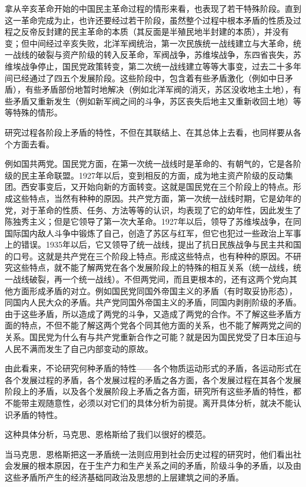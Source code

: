 拿从辛亥革命开始的中国民主革命过程的情形来看，也表现了若干特殊阶段。直到这一革命完成为止，也许还要经过若干阶段，虽然整个过程中根本矛盾的性质及过程之反帝反封建的民主革命的本质（其反面是半殖民地半封建的本质），并没有变；但中间经过辛亥失败，北洋军阀统治，第一次民族统一战线建立与大革命，统一战线的破裂与资产阶级的转入反革命，军阀战争，苏维埃战争，东四省丧失，苏维埃战争停止，国民党政策转变，第二次统一战线建立等等大事变，过去二十多年间已经通过了四五个发展阶段。这些阶段中，包含着有些矛盾激化（例如中日矛盾），有些矛盾部份地暂时地解决（例如北洋军阀的消灭，苏区没收地主土地），有些矛盾又重新发生（例如新军阀之间的斗争，苏区丧失后地主又重新收回土地）等等特殊的情形。

研究过程各阶段上矛盾的特性，不但在其联结上、在其总体上去看，也同样要从各个方面去看。

例如国共两党。国民党方面，在第一次统一战线时是革命的、有朝气的，它是各阶级的民主革命联盟。1927年以后，变到相反的方面，成为地主资产阶级的反动集团。西安事变后，又开始向新的方面转变。这就是国民党在三个阶段上的特点。形成这些特点，当然有种种的原因。共产党方面，第一次统一战线时期，它是幼年的党，对于革命的性质、任务、方法等等的认识，均表现了它的幼年性，因此发生了陈独秀主义；但是它领导了第一次大革命。1927年以后，领导了苏维埃战争，在同国际国内敌人斗争中锻炼了自己，创造了苏区与红军，但它也犯过一些政治上军事上的错误。1935年以后，它又领导了统一战线，提出了抗日民族战争与民主共和国的口号。这就是共产党在三个阶段上特点。形成这些特点，也有种种的原因。不研究这些特点，就不能了解两党在各个发展阶段上的特殊的相互关系（统一战线，统一战线破裂，再一个统一战线）。不但两党间，而且更根本的，还有这两个党向其他方面形成矛盾的对立。例如国民党同国外帝国主义的矛盾（有时取妥协形态），同国内人民大众的矛盾。共产党同国外帝国主义的矛盾，同国内剥削阶级的矛盾。由于这些矛盾，所以造成了两党的斗争，又造成了两党的合作。不了解这些矛盾方面的特点，不但不能了解这两个党各个同其他方面的关系，也不能了解两党之间的关系。国民党为什么有与共产党重新合作之可能？就是因为国民党受了日本压迫与人民不满而发生了自己内部变动的原故。

由此看来，不论研究何种矛盾的特性——各个物质运动形式的矛盾，各运动形式在各个发展过程的矛盾，各个发展过程的矛盾之各方面，各个发展过程在其各个发展阶段上的矛盾，以及各个发展阶段上矛盾之各方面，研究所有这些矛盾的特性，都不能带主观随意性，必须以对它们的具体分析为前提。离开具体分析，就决不能认识矛盾的特性。

这种具体分析，马克思、恩格斯给了我们以很好的模范。

当马克思．恩格斯把这一矛盾统一法则应用到社会历史过程的研究时，他们看出社会发展的根本原因，在于生产力和生产关系之间的矛盾，阶级斗争的矛盾，以及由这些矛盾所产生的经济基础同政治及思想的上层建筑之间的矛盾。

